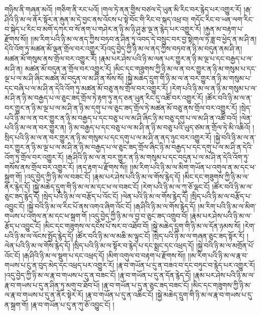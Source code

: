 གཉིས་ནི་གཞན་མའོ། །གཅིག་ནི་རང་པའོ། །གལ་ཏེ་ནན་གྱིས་བཙལ་དེ་ཡུན་མི་རིང་བར་རྙེད་པར་འགྱུར་རོ། །རྒ་ཤིའི་ཉི་མ་ལ་ནོར་སྟོར་ན་རྐུན་མ་དེ་བྱང་ནས་འོངས་པ་སྟེ་བོང་གི་རིང་བ་སྐད་འཕྲ་བ། གདོང་རིང་བ་ཡན་ལག་རིང་བ་སྐེད་པ་རིང་བ་མགོ་དཀར་བ་སོ་ནག་པ་གཤེར་ན་ཉི་མ་ཉི་ཤུ་རྩ་ལྔ་ན་རྙེད་པར་འགྱུར་རོ། །རྐུན་མ་བརྟག་པ་རྫོགས་སོ།། །།མ་རིག་པའི་ཉི་མ་ལ་ནད་ཀྱིས་བཏབ་ན་ཤིན་ཏུ་འབད་དེ་བསྲུང་བར་བྱ་སྟེ།གལ་ཏེ་ཟླ་བ་ཕྱེད་ན་མ་ཤི་ན། དེའི་འོག་ཏུ་མཚན་མོ་ལྡན་གྲོལ་བར་འགྱུར་རོ།འདུ་བྱེད་ཀྱི་ཉི་མ་ལ་ནད་ཀྱིས་བཏབ་ན་ཉི་མ་བདུན་ནམ་ཤི་ན། མཚན་མོ་གསུམ་ནས་གྲོལ་བར་འགྱུར་རོ། །རྣམ་པར་ཤེས་པའི་ཉི་མ་ལན་པར་གྱུར་ན་ཉི་མ་ལྔ་པ་དང་བརྒྱད་པ་ལ་མ་ཤི་ན། མཚན་མོ་བདུན་ན་གྲོལ་བར་འགྱུར་རོ། །མིང་དང་གཟུགས་ཀྱི་ཉི་མ་ལ་ན་བར་གྱུར་ན་ཉི་མ་གསུམ་པ་དང་ལྔ་པ་ལ་མ་ཤི་ཞིང་མཚན་མོ་བདུན་ལ་མ་ཤི་ན་སོས་སོ། །སྐྱེ་མཆེད་དྲུག་གི་ཉི་མ་ལ་ན་བར་གྱུར་ན་ཉི་མ་གསུམ་པ་དང་བཞི་པ་ལ་མ་ཤི་ན་དེའི་འོག་ཏུ་མཚན་མོ་བཅུ་ནས་གྲོལ་བར་འགྱུར་རོ། །རེག་པའི་ཉི་མ་ལ་ན་ཉི་མ་གསུམ་པ་ལ་མ་ཤི་ན་ཉི་མ་བརྒྱད་པ་ལ་ཅུང་ཟད་གྲོལ་ཏེ་རྟག་ཏུ་ནད་ཅན་ཡུན་རིང་དུ་འཚོ་བར་འགྱུར་རོ། །ཚོར་བའི་ཉི་མ་ལ་ན་བར་གྱུར་ན་ཉི་མ་ལྔ་པ་ལ་མ་ཤི་ན་ཉི་མ་དགུ་པ་ལ་ཅུང་ཟད་གྲོལ་ཏེ་མཚན་མོ་བཅུ་ནས་གྲོལ་བར་འགྱུར་རོ། །སྲེད་པའི་ཉི་མ་ལ་ན་བར་གྱུར་ན་ཉི་མ་བརྒྱད་པ་དང་བཅུ་པ་ལ་མ་ཤི་ཞིང་ཉི་མ་བཅུ་དགུ་པ་ལ་མ་ཤི་ན་འཚོ་བའོ། །ལེན་པའི་ཉི་མ་ལ་ན་བར་གྱུར་ན། ཉི་མ་བརྒྱད་པ་དང་བཅུ་པ་ལ་མ་ཤི་ན་ཉི་མ་བཅུ་པའི་ཡུད་ཙམ་ན་གྲོལ་ཏེ་མི་འཆིའོ། །སྲིད་པའི་ཉི་མ་ལ་ན་བར་གྱུར་ན་ཉི་མ་གསུམ་པ་དང་དགུ་པ་ལ་མ་ཤི་ན་ནད་ཉུང་བར་འགྱུར་རོ། །སྐྱེ་བའི་ཉི་མ་ལ་ན་བར་གྱུར་ན་ཉི་མ་ལྔ་པ་ལ་མ་ཤི་ན་ཉི་མ་བརྒྱད་པ་ལ་ཅུང་ཟད་གྲོལ་ཞིང་ཉི་མ་བརྒྱད་པ་དང་དགུ་པ་ལ་མ་ཤི་ན་དེའི་འོག་ཏུ་གྲོལ་བར་འགྱུར་རོ། །རྒ་ཤིའི་ཉི་མ་ལ་ན་བར་གྱུར་ན་ཉི་མ་གསུམ་པ་དང་བདུན་པ་ལ་མ་ཤི་ན་དེའི་འོག་ཏུ་གསོས་ནས་གྲོལ་བར་འགྱུར་རོ། །ནད་རྟག་པ་རྫོགས་སོ།། །།མ་རིག་པའི་ཉི་མ་ལ་མིག་གཡོན་པ་འགུལ་ན་མ་དང་ཕ་སྐྲག་གོ། །འདུ་བྱེད་ཀྱི་ཉི་མ་ལ་བཟང་ངོ། །རྣམ་པར་ཤེས་པའི་ཉི་མ་ལ་གོས་རྙེད་དོ། །མིང་དང་གཟུགས་ཀྱི་ཉི་མ་ལ་ནོར་རྙེད་དོ། །སྐྱེ་མཆེད་དྲུག་གི་ཉི་མ་ལ་མ་དང་ཕ་ལ་བཟང་ངོ། །རེག་པའི་ཉི་མ་ལ་ཀུ་ཅོ་ལྡང་ངོ། །ཚོར་བའི་ཉི་མ་ལ་ཅུང་ཟད་རྙེད་དོ། །སྲེད་པའི་ཉི་མ་ལ་བརྩོད་པ་འོང་ངོ། །ལེན་པའི་ཉི་མ་ལ་གོས་རྙེད་དོ། །སྲིད་པའི་ཉི་མ་ལ་བརྩོད་པ་འབྱུང་ངོ། །སྐྱེ་བའི་ཉི་མ་ལ་རིང་པོ་ནས་འགའ་ཞིག་འོང་ངོ། །རྒ་ཤིའི་ཉི་མ་ལ་གོས་རྙེད་དོ། །མ་རིག་པའི་ཉི་མ་ལ་མིག་གཡས་པ་འགུལ་ན་མ་དང་ཕ་སྐྲག་གོ །འདུ་བྱེད་ཀྱི་ཉི་མ་ལ་བྱ་བ་ཅུང་ཟད་འགྲུབ་བོ། །རྣམ་པར་ཤེས་པའི་ཉི་མ་ལ་རྩོད་པ་འབྱུང་ངོ། །མིང་དང་གཟུགས་ལ་དངོས་པོ་སར་བ་འཐོབ་བོ། །སྐྱེ་མཆེད་དྲུག་གི་ཉི་མ་ལ་དོན་ཉམས་སོ། །རེག་པའི་ཉི་མ་ལ་ལོངས་སྤྱོད་རྙེད་དོ། །ཚོར་བའི་ཉི་མ་ལ་མཆི་མ་ལྟུང་ངོ། །སྲེད་པའི་ཉི་མ་ལ་གཞན་ཅུང་ཟད་སྟོར་རོ། །ལེན་པའི་ཉི་མ་ལ་གོས་རྙེད་དོ། །སྲིད་པའི་ཉི་མ་ལ་སྟོར་བ་རྙེད་པ་དང་སྨྲང་དང་འཕྲད་དོ། །སྐྱེ་བའི་ཉི་མ་ལ་མགྲོན་པོ་འོང་ངོ། །རྒ་ཤིའི་ཉི་མ་ལ་སྡུག་པ་དང་འཕྲད་དོ། །མིག་འགུལ་བ་བརྟག་པ་རྫོགས་སོ།། །།མ་རིག་པའི་ཉི་མ་ལ་རྣ་བ་གཡས་པ་ངུ་ན་བུད་མེད་དང་འཕྲད་པར་འགྱུར་རོ། །རྣ་བ་གཡོན་པ་དུ་ན་བཟའ་བ་དང་བཏུང་བ་རྙེད་པར་འགྱུར་རོ། །འདུ་བྱེད་ཀྱི་ཉི་མ་ལ་རྣ་བ་གཡས་པ་དུ་ན་བཟང་ངོ། །རྣ་བ་གཡོན་པ་དུ་ན་དོན་རྙེད་དོ། །རྣམ་པར་ཤེས་པའི་ཉི་མ་ལ་རྣ་བ་གཡས་པ་དུ་ན་ཤིན་ཏུ་མགུ་བ་ཐོབ་པོ། །རྣ་བ་གཡོན་པ་དུ་ན་ཅུང་ཟད་བཟང་ངོ། །མིང་དང་གཟུགས་ཀྱི་ཉི་མ་ལ་རྣ་བ་གཡས་པ་དུ་ན་ནོར་སྟེར་རོ། །རྣ་བ་གཡོན་པ་དུ་ན་འཆིང་ངོ། །སྐྱེ་མཆེད་དྲུག་གི་ཉི་མ་ལ་རྣ་བ་གཡས་པ་དུ་ན་སྐྲག་གོ། །རྣ་བ་གཡོན་པ་དུ་ན་ཀུ་ཅོ་འབྱུང་ངོ། །
